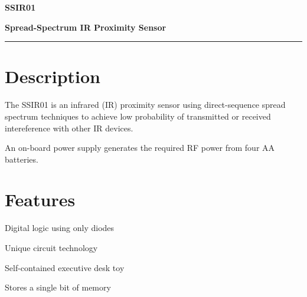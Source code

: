 \documentclass{article}
\newcommand{\partnumber}{SSIR01}
\newcommand{\partdesc}{Spread-Spectrum IR Proximity Sensor}
\begin{document}
\pagestyle{bar}
\thispagestyle{foo}

\renewcommand{\familydefault}{\sfdefault}
\selectfont

\Huge
\noindent\textbf{\partnumber}

\vspace{0.1in}
\large
\noindent\textbf{\partdesc}

\vspace{-0.05in}
\noindent\rule{\textwidth}{1pt}
\normalsize

\vspace{0.25in}


\noindent \begin{minipage}[t][0.45\textwidth]{0.45\textwidth}
\section*{Description}
The SSIR01 is an infrared (IR) proximity sensor using direct-sequence
spread spectrum techniques to achieve low probability of transmitted or
received intereference with other IR devices.

\vspace{0.1in}
An on-board power supply generates the required RF power from four AA
batteries.

\end{minipage}
\hspace{0.05\textwidth}
\begin{minipage}[t][0.45\textwidth]{0.45\textwidth}
\section*{Features}
\begin{itemize*}
\item Digital logic using only diodes
\item Unique circuit technology
\item Self-contained executive desk toy
\item Stores a single bit of memory
\end{itemize*}
\vfill
\end{minipage}

\vspace{0.1in}

\newcommand{\ecrow}[9]
{
  \multirow{3}{*}{#1} & \multirow{3}{*}{#2} & #4 & & #5 & & \multirow{3}{*}{#3} \\
  \cline{3-6}
  & & #6 & & #7 & & \\
  \cline{3-6}
  & & #8 & & #9 & & \\
}
\end{document}
